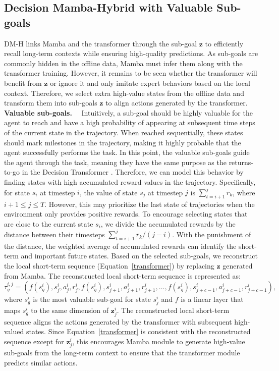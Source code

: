 \documentclass{article}
\begin{document}
\subsection{Decision Mamba-Hybrid with Valuable Sub-goals}
DM-H links Mamba and the transformer through the sub-goal $\textbf{z}$ to efficiently recall long-term contexts while ensuring high-quality predictions. As sub-goals are commonly hidden in the offline data, Mamba must infer them along with the transformer training. However, it remains to be seen whether the transformer will benefit from $\textbf{z}$ or ignore it and only imitate expert behaviors based on the local context. Therefore, we select extra high-value states from the offline data and transform them into sub-goals $\textbf{z}$ to align actions generated by the transformer.
\noindent\textbf{Valuable sub-goals.}~~
Intuitively, a sub-goal should be highly valuable for the agent to reach and have a high probability of appearing at subsequent time steps of the current state in the trajectory. When reached sequentially, these states should mark milestones in the trajectory, making it highly probable that the agent successfully performs the task. In this point, the valuable sub-goals guide the agent through the task, meaning they have the same purpose as the returns-to-go in the Decision Transformer \cite{2}. Therefore, we can model this behavior by finding states with high accumulated reward values in the trajectory. Specifically, for state $s_i$ at timestep $i$, the value of state $s_j$ at timestep $j$ is $\sum_{t=i+1}^jr_k$, where $i+1\leq j\leq T$. However, this may prioritize the last state of trajectories when the environment only provides positive rewards. To encourage selecting states that are close to the current state $s_i$, we divide the accumulated rewards by the distance between their timesteps $\sum_{t=i+1}^jr_k/(j-i)$. With the punishment of the distance, the weighted average of accumulated rewards can identify the short-term and important future states.
Based on the selected sub-goals, we reconstruct the local short-term sequence (Equation~\eqref{transformer}) by replacing $\textbf{z}$ generated from Mamba. The reconstructed local short-term sequence is represented as:
\begin{equation}
\tau_g^{i,j}=(f(s_g^i),s_j^i,a_j^i,r_j^i, f(s_g^i),s_{j+1}^i,a_{j+1}^i,r_{j+1}^i, \dots,f(s_g^i),s_{j+c-1}^i,a_{j+c-1}^i,r_{j+c-1}^i),
\label{g_transformer}
\end{equation}
where $s_g^i$ is the most valuable sub-goal for state $s_j^i$ and $f$ is a linear layer that maps $s_g^i$ to the same dimension of $\textbf{z}_{j}^i$. The reconstructed local short-term sequence aligns the actions generated by the transformer with subsequent high-valued states. Since Equation~\eqref{transformer} is consistent with the reconstructed sequence except for $\textbf{z}_{j}^i$, this encourages Mamba module to generate high-value sub-goals from the long-term context to ensure that the transformer module predicts similar actions.
\end{document}
